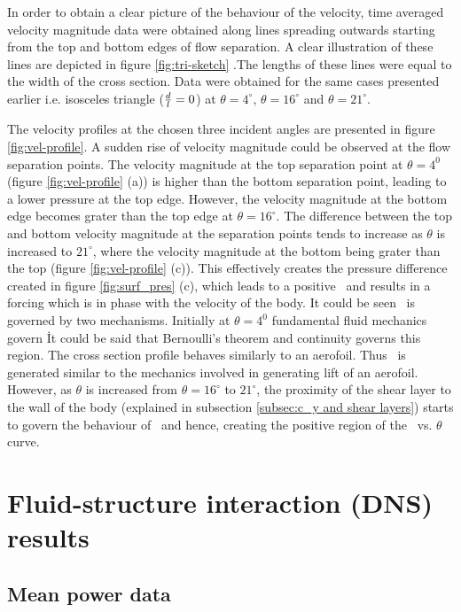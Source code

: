 In order to obtain a clear picture of the behaviour of the velocity, time averaged velocity magnitude data were obtained along lines spreading outwards starting from the top and bottom edges of flow separation. A clear illustration of these lines are depicted in figure \ref{fig:tri-sketch} .The lengths of these lines were equal to the width of the cross section. Data were obtained for the same cases presented earlier i.e. isosceles triangle ($\frac{d}{l}=0$) at $\theta=4^{\circ}$, $\theta=16^{\circ}$ and $\theta=21^{\circ}$.



The velocity profiles at the chosen three incident angles are presented in figure \ref{fig:vel-profile}. A sudden rise of velocity magnitude could be observed at the flow separation points. The velocity magnitude at the top separation point  at $\theta= 4^{0}$ (figure \ref{fig:vel-profile} (a)) is higher than the bottom separation point, leading to a lower pressure at the top edge. However, the velocity magnitude at the bottom edge becomes grater than the top edge at $\theta=16^{\circ}$. The difference between the top and bottom velocity magnitude at the separation points tends to increase as $\theta$ is increased to $21^{\circ}$, where the velocity magnitude at the bottom being grater than the top (figure \ref{fig:vel-profile} (c)). This effectively creates the pressure difference created in figure \ref{fig:surf_pres} (c), which leads to a positive \cy\ and results in a forcing which is in phase with the velocity of the body. It could be seen \cy\ is governed by two mechanisms. Initially at $\theta= 4^{0}$ fundamental fluid mechanics govern \cy\. It could be said that Bernoulli's theorem and continuity governs this region. The cross section profile behaves similarly to an aerofoil. Thus \cy\ is generated similar to the mechanics involved in generating lift of an aerofoil. However, as $\theta$ is increased from $\theta=16^{\circ}$ to $21^{\circ}$, the proximity of the shear layer to the wall of the body (explained in subsection \ref{subsec:c_y and shear layers}) starts to govern the behaviour of \cy\ and hence, creating the positive region of the \cy\ vs. $\theta$ curve. 


\section{Fluid-structure interaction (DNS) results}
\label{sec:cross-sec-FSI-results}

\subsection{Mean power data}
\label{subsec:cross-sec-dns-mean-power}

